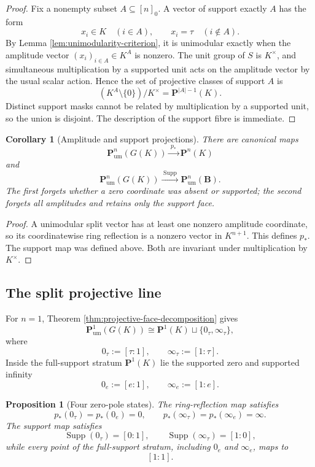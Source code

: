 \documentclass[11pt]{amsart}
\numberwithin{equation}{section}
\newtheorem{proposition}[theorem]{Proposition}
\newtheorem{corollary}[theorem]{Corollary}
\theoremstyle{definition}
\newcommand{\B}{\mathbf B}
\newcommand{\Supp}{\operatorname{Supp}}
\newcommand{\Pum}{\mathbf P_{\mathrm{um}}}
\begin{document}
\begin{proof}
Fix a nonempty subset $A\subseteq[n]_0$.  A vector of support exactly $A$ has the form
\[
x_i\in K\quad(i\in A),
\qquad
x_i=\tau\quad(i\notin A).
\]
By Lemma \ref{lem:unimodularity-criterion}, it is unimodular exactly when the amplitude vector $(x_i)_{i\in A}\in K^A$ is nonzero.  The unit group of $S$ is $K^\times$, and simultaneous multiplication by a supported unit acts on the amplitude vector by the usual scalar action.  Hence the set of projective classes of support $A$ is
\[
(K^A\setminus\{0\})/K^\times
=\mathbf P^{|A|-1}(K).
\]
Distinct support masks cannot be related by multiplication by a supported unit, so the union is disjoint.  The description of the support fibre is immediate.
\end{proof}

\begin{corollary}[Amplitude and support projections]\label{cor:projective-projections}
There are canonical maps
\[
\Pum^n(G(K))\xrightarrow{\;p_*\;}\mathbf P^n(K)
\]
and
\[
\Pum^n(G(K))\xrightarrow{\;\Supp\;}\Pum^n(\B).
\]
The first forgets whether a zero coordinate was absent or supported; the second forgets all amplitudes and retains only the support face.
\end{corollary}

\begin{proof}
A unimodular split vector has at least one nonzero amplitude coordinate, so its coordinatewise ring reflection is a nonzero vector in $K^{n+1}$.  This defines $p_*$.  The support map was defined above.  Both are invariant under multiplication by $K^\times$.
\end{proof}

\subsection{The split projective line}

For $n=1$, Theorem \ref{thm:projective-face-decomposition} gives
\[
\Pum^1(G(K))
\cong
\mathbf P^1(K)\sqcup\{0_\tau,\infty_\tau\},
\]
where
\[
0_\tau:=[\tau:1],
\qquad
\infty_\tau:=[1:\tau].
\]
Inside the full-support stratum $\mathbf P^1(K)$ lie the supported zero and supported infinity
\[
0_e:=[e:1],
\qquad
\infty_e:=[1:e].
\]

\begin{proposition}[Four zero-pole states]\label{prop:four-zero-pole-states}
The ring-reflection map satisfies
\[
p_*(0_\tau)=p_*(0_e)=0,
\qquad
p_*(\infty_\tau)=p_*(\infty_e)=\infty.
\]
The support map satisfies
\[
\Supp(0_\tau)=[0:1],
\qquad
\Supp(\infty_\tau)=[1:0],
\]
while every point of the full-support stratum, including $0_e$ and $\infty_e$, maps to
\[
[1:1].
\]
\end{proposition}
\end{document}

